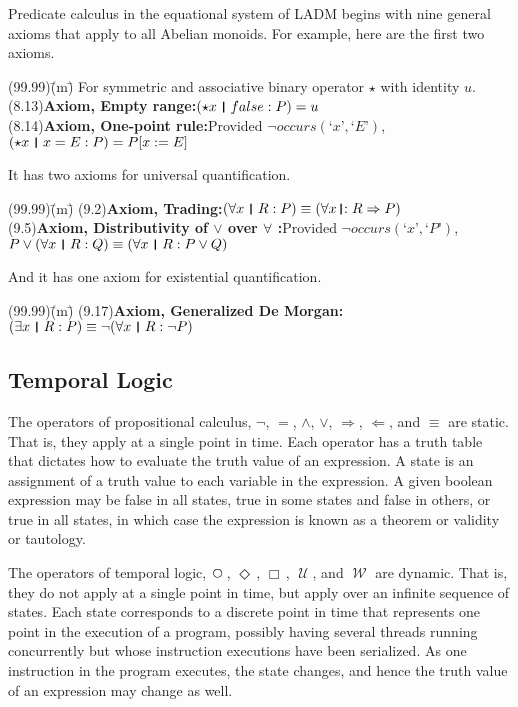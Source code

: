 \documentclass[12pt, fleqn, leqno]{article}
\newcommand{\lgap}{2pt}                             %
\newcommand{\impl}{\ensuremath{\Rightarrow}}        %
\newcommand{\foll}{\ensuremath{\Leftarrow}}         %
\newcommand{\Until}{\;\mathcal{U}\;}
\newcommand{\Wait}{\;\mathcal{W}\;}
\newcommand{\Next}{\;\,\text{\raisebox{3.5pt}{\circle{6}}}}
\newcommand{\Event}{\Diamond\,}
\newcommand{\Always}{\Box\,}
\newcommand{\thedr}{\rule[-.25ex]{.32mm}{1.75ex}}   %
\newcommand{\dr}{\;\,\thedr\,\;}                    %
\newcommand{\rb}{:}                                 %
\newcommand{\drrb}{\;\thedr\,{:}\;}                 %
\newcommand{\all}{\forall}                          %
\newcommand{\ext}{\exists}                          %
\newcommand{\Lq}{\mbox{`}}
\newcommand{\Rq}{\mbox{'}}
\begin{document}
Predicate calculus in the equational system of LADM begins with nine general axioms that apply to all Abelian monoids.
For example, here are the first two axioms.
\begin{tabbing}
(99.99)\;\=(m)\;\=\kill
For symmetric and associative binary operator $\star$ with identity $u$.\\[\lgap]
(8.13)\>\textbf{Axiom, Empty range:}\quad $(\star x \dr false \rb P) =u$\\[\lgap]
(8.14)\>\textbf{Axiom, One-point rule:}\quad Provided $\neg occurs(\Lq x\Rq ,\Lq E\Rq)$,\\[\lgap]
      \>$(\star x\dr x=E\rb P) = P[x:=E]$
\end{tabbing}
It has two axioms for universal quantification.
\begin{tabbing}
(99.99)\;\=(m)\;\=\kill
(9.2)\>\textbf{Axiom, Trading:}\quad $(\all x\dr R\rb P)\equiv (\all x\drrb R\impl P)$\\[\lgap]
(9.5)\>\textbf{Axiom, Distributivity of $\lor$ over $\all$ :}\quad Provided $\neg occurs(\Lq x\Rq ,\Lq P\Rq)$,\\[\lgap]
      \>$P\lor (\all x\dr R\rb Q)\equiv (\all x\dr R\rb P\lor Q)$
\end{tabbing}
And it has one axiom for existential quantification.
\begin{tabbing}
(99.99)\;\=(m)\;\=\kill
(9.17)\>\textbf{Axiom, Generalized De Morgan:}\quad $(\ext x\dr R\rb P)\equiv \neg (\all x\dr R\rb \neg P)$
\end{tabbing}

\subsection{Temporal Logic}

The operators of propositional calculus, $\neg$, $=$, $\land$, $\lor$, $\impl$, $\foll$, and $\equiv$ are static.
That is, they apply at a single point in time.
Each operator has a truth table that dictates how to evaluate the truth value of an expression.
A state is an assignment of a truth value to each variable in the expression.
A given boolean expression may be false in all states, true in some states and false in others, or true in all states, in which case the expression is known as a theorem or validity or tautology.

The operators of temporal logic, $\Next$, $\Event$, $\Always$, $\Until$, and $\Wait$ are dynamic.
That is, they do not apply at a single point in time, but apply over an infinite sequence of states.
Each state corresponds to a discrete point in time that represents one point in the execution of a program,
possibly having several threads running concurrently but whose instruction executions have been serialized.
As one instruction in the program executes, the state changes, and hence the truth value of an expression may change as well.
\end{document}
